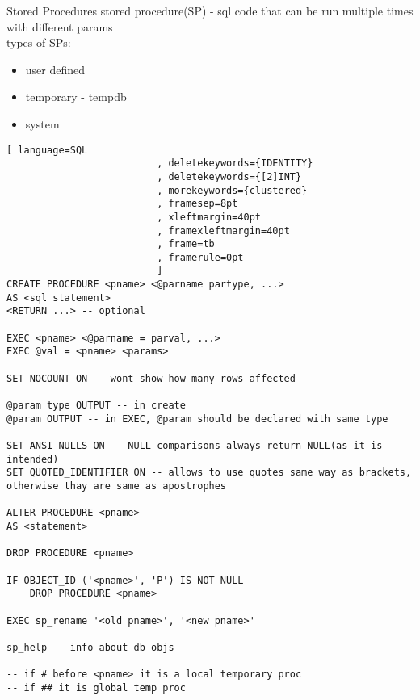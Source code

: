 \documentclass{article}
\begin{document}
    \begin{section}{Stored Procedures}
        stored procedure(SP) - sql code that can be run multiple times with different params \\
        types of SPs:
        \begin{itemize}
            \item user defined
            \item temporary - tempdb
            \item system
        \end{itemize}

        \begin{lstlisting}[ language=SQL
                          , deletekeywords={IDENTITY}
                          , deletekeywords={[2]INT}
                          , morekeywords={clustered}
                          , framesep=8pt
                          , xleftmargin=40pt
                          , framexleftmargin=40pt
                          , frame=tb
                          , framerule=0pt 
                          ]
CREATE PROCEDURE <pname> <@parname partype, ...>
AS <sql statement>
<RETURN ...> -- optional

EXEC <pname> <@parname = parval, ...>
EXEC @val = <pname> <params>

SET NOCOUNT ON -- wont show how many rows affected

@param type OUTPUT -- in create 
@param OUTPUT -- in EXEC, @param should be declared with same type

SET ANSI_NULLS ON -- NULL comparisons always return NULL(as it is intended)
SET QUOTED_IDENTIFIER ON -- allows to use quotes same way as brackets, otherwise thay are same as apostrophes

ALTER PROCEDURE <pname>
AS <statement>

DROP PROCEDURE <pname>

IF OBJECT_ID ('<pname>', 'P') IS NOT NULL
    DROP PROCEDURE <pname>

EXEC sp_rename '<old pname>', '<new pname>'

sp_help -- info about db objs

-- if # before <pname> it is a local temporary proc
-- if ## it is global temp proc
        \end{lstlisting}
    \end{section}
\end{document}
